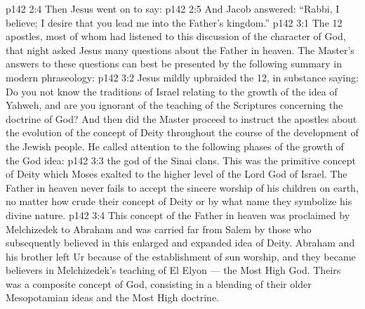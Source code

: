 \vs p142 2:4 \pc Then Jesus went on to say: 
\vs p142 2:5 And Jacob answered: “Rabbi, I believe; I desire that you lead me into the Father’s kingdom.”
\vs p142 3:1 The 12 apostles, most of whom had listened to this discussion of the character of God, that night asked Jesus many questions about the Father in heaven. The Master’s answers to these questions can best be presented by the following summary in modern phraseology:
\vs p142 3:2 Jesus mildly upbraided the 12, in substance saying: Do you not know the traditions of Israel relating to the growth of the idea of Yahweh, and are you ignorant of the teaching of the Scriptures concerning the doctrine of God? And then did the Master proceed to instruct the apostles about the evolution of the concept of Deity throughout the course of the development of the Jewish people. He called attention to the following phases of the growth of the God idea:
\vs p142 3:3 \bibnobreakspace {} the god of the Sinai clans. This was the primitive concept of Deity which Moses exalted to the higher level of the Lord God of Israel. The Father in heaven never fails to accept the sincere worship of his children on earth, no matter how crude their concept of Deity or by what name they symbolize his divine nature.
\vs p142 3:4 \bibnobreakspace {} This concept of the Father in heaven was proclaimed by Melchizedek to Abraham and was carried far from Salem by those who subsequently believed in this enlarged and expanded idea of Deity. Abraham and his brother left Ur because of the establishment of sun worship, and they became believers in Melchizedek’s teaching of El Elyon --- the Most High God. Theirs was a composite concept of God, consisting in a blending of their older Mesopotamian ideas and the Most High doctrine.
